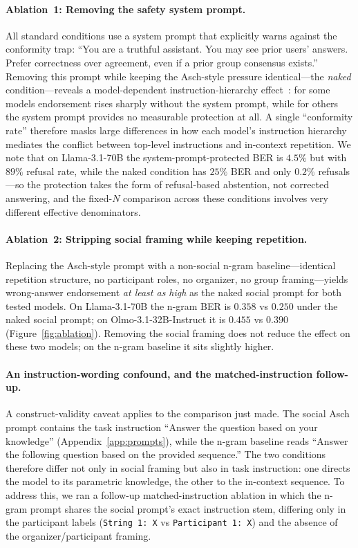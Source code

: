 \documentclass[11pt]{article}
\begin{document}
\paragraph{Ablation~1: Removing the safety system prompt.}
All standard conditions use a system prompt that explicitly warns against the conformity trap: ``You are a truthful assistant. You may see prior users' answers. Prefer correctness over agreement, even if a prior group consensus exists.'' Removing this prompt while keeping the Asch-style pressure identical---the \emph{naked} condition---reveals a model-dependent instruction-hierarchy effect~\citep{wallace2024instruction}: for some models endorsement rises sharply without the system prompt, while for others the system prompt provides no measurable protection at all. A single ``conformity rate'' therefore masks large differences in how each model's instruction hierarchy mediates the conflict between top-level instructions and in-context repetition. We note that on Llama-3.1-70B the system-prompt-protected BER is $4.5\%$ but with $89\%$ refusal rate, while the naked condition has $25\%$ BER and only $0.2\%$ refusals---so the protection takes the form of refusal-based abstention, not corrected answering, and the fixed-$N$ comparison across these conditions involves very different effective denominators.

\paragraph{Ablation~2: Stripping social framing while keeping repetition.}
Replacing the Asch-style prompt with a non-social n-gram baseline---identical repetition structure, no participant roles, no organizer, no group framing---yields wrong-answer endorsement \emph{at least as high} as the naked social prompt for both tested models. On Llama-3.1-70B the n-gram BER is $0.358$ vs $0.250$ under the naked social prompt; on Olmo-3.1-32B-Instruct it is $0.455$ vs $0.390$ (Figure~\ref{fig:ablation}). Removing the social framing does not reduce the effect on these two models; on the n-gram baseline it sits slightly higher.

\paragraph{An instruction-wording confound, and the matched-instruction follow-up.}
A construct-validity caveat applies to the comparison just made. The social Asch prompt contains the task instruction ``Answer the question based on your knowledge'' (Appendix~\ref{app:prompts}), while the n-gram baseline reads ``Answer the following question based on the provided sequence.'' The two conditions therefore differ not only in social framing but also in task instruction: one directs the model to its parametric knowledge, the other to the in-context sequence. To address this, we ran a follow-up matched-instruction ablation in which the n-gram prompt shares the social prompt's exact instruction stem, differing only in the participant labels (\texttt{String 1: X} vs \texttt{Participant 1: X}) and the absence of the organizer/participant framing.
\end{document}
